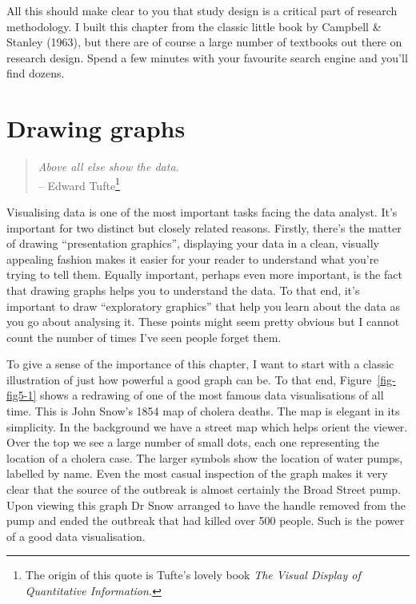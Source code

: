 \documentclass[
  letterpaper,
]{book}
\begin{document}
All this should make clear to you that study design is a critical part
of research methodology. I built this chapter from the classic little
book by Campbell \& Stanley (1963), but there are of course a large
number of textbooks out there on research design. Spend a few minutes
with your favourite search engine and you'll find dozens.

\hypertarget{sec-Drawing-graphs}{%
\chapter{Drawing graphs}\label{sec-Drawing-graphs}}

\begin{quote}
\emph{Above all else show the data.}\\
-- Edward Tufte\footnote{The origin of this quote is Tufte's lovely book
  \emph{The Visual Display of Quantitative Information.}}
\end{quote}

Visualising data is one of the most important tasks facing the data
analyst. It's important for two distinct but closely related reasons.
Firstly, there's the matter of drawing ``presentation graphics'',
displaying your data in a clean, visually appealing fashion makes it
easier for your reader to understand what you're trying to tell them.
Equally important, perhaps even more important, is the fact that drawing
graphs helps you to understand the data. To that end, it's important to
draw ``exploratory graphics'' that help you learn about the data as you
go about analysing it. These points might seem pretty obvious but I
cannot count the number of times I've seen people forget them.

To give a sense of the importance of this chapter, I want to start with
a classic illustration of just how powerful a good graph can be. To that
end, Figure~\ref{fig-fig5-1} shows a redrawing of one of the most famous
data visualisations of all time. This is John Snow's 1854 map of cholera
deaths. The map is elegant in its simplicity. In the background we have
a street map which helps orient the viewer. Over the top we see a large
number of small dots, each one representing the location of a cholera
case. The larger symbols show the location of water pumps, labelled by
name. Even the most casual inspection of the graph makes it very clear
that the source of the outbreak is almost certainly the Broad Street
pump. Upon viewing this graph Dr Snow arranged to have the handle
removed from the pump and ended the outbreak that had killed over 500
people. Such is the power of a good data visualisation.
\end{document}
